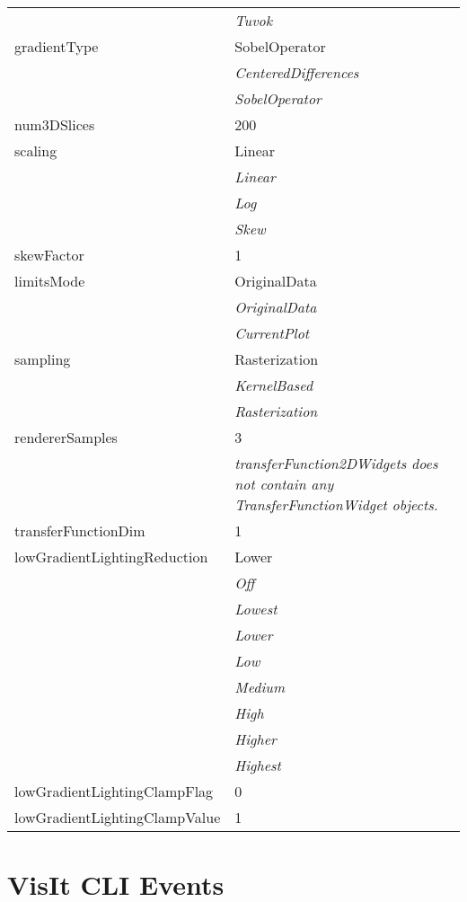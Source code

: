 \documentclass[10pt,a4paper]{report}
\begin{document}
\begin{longtable}{lp{7.5cm}}
 & {\it  Tuvok} \\
gradientType  &  SobelOperator   \\
 & {\it  CenteredDifferences} \\
 & {\it  SobelOperator} \\
num3DSlices  &  200 \\
scaling  &  Linear   \\
 & {\it  Linear} \\
 & {\it  Log} \\
 & {\it  Skew} \\
skewFactor  &  1 \\
limitsMode  &  OriginalData   \\
 & {\it  OriginalData} \\
 & {\it  CurrentPlot} \\
sampling  &  Rasterization   \\
 & {\it  KernelBased} \\
 & {\it  Rasterization} \\
rendererSamples  &  3 \\
 & {\it transferFunction2DWidgets does not contain any TransferFunctionWidget objects.} \\
transferFunctionDim  &  1 \\
lowGradientLightingReduction  &  Lower   \\
 & {\it  Off} \\
 & {\it  Lowest} \\
 & {\it  Lower} \\
 & {\it  Low} \\
 & {\it  Medium} \\
 & {\it  High} \\
 & {\it  Higher} \\
 & {\it  Highest} \\
lowGradientLightingClampFlag  &  0 \\
lowGradientLightingClampValue  &  1 \\
\end{longtable}

\newpage
\newpage
\chapter{VisIt CLI Events}

\end{document}
